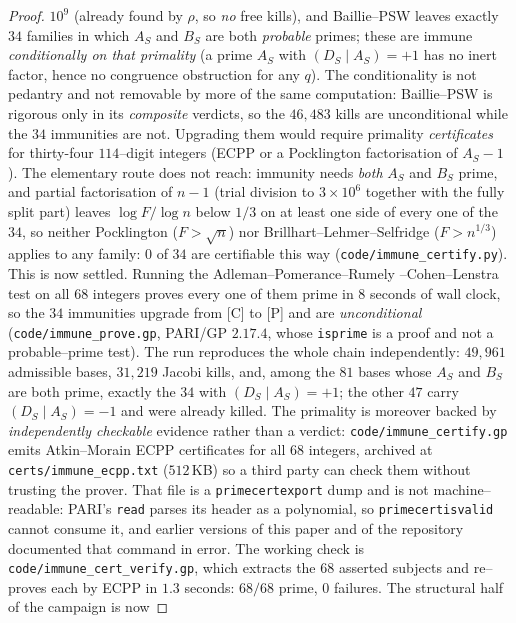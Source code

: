 \documentclass[11pt]{article}
\theoremstyle{definition}
\begin{document}
\begin{proof}
$10^9$ (already found by $\rho$, so \emph{no} free kills), and Baillie--PSW leaves exactly
$34$ families in which $A_S$ and $B_S$ are both \emph{probable} primes; these are immune
\emph{conditionally on that primality} (a prime $A_S$ with $(D_S\mid A_S)=+1$ has no inert factor,
hence no congruence obstruction for any $q$). The conditionality is not pedantry and not
removable by more of the same computation: Baillie--PSW is rigorous only in its \emph{composite}
verdicts, so the $46{,}483$ kills are unconditional while the $34$ immunities are not. Upgrading them
would require primality \emph{certificates} for thirty-four $114$--digit integers (ECPP or a
Pocklington factorisation of $A_S-1$). The elementary route does not reach: immunity needs
\emph{both} $A_S$ and $B_S$ prime, and partial factorisation of $n-1$ (trial division to
$3\times10^6$ together with the fully split part) leaves $\log F/\log n$ below $1/3$ on at least one
side of every one of the $34$, so neither Pocklington ($F>\sqrt n$) nor
Brillhart--Lehmer--Selfridge ($F>n^{1/3}$) applies to any family: $0$ of $34$ are certifiable this
way (\texttt{code/immune\_certify.py}). This is now settled. Running the Adleman--Pomerance--Rumely
--Cohen--Lenstra test on all $68$ integers proves every one of them prime in $8$ seconds of
wall clock, so the $34$ immunities upgrade from \textup{[C]} to \textup{[P]} and are
\emph{unconditional} (\texttt{code/immune\_prove.gp}, PARI/GP $2.17.4$, whose \texttt{isprime} is a
proof and not a probable--prime test). The run reproduces the whole chain independently: $49{,}961$
admissible bases, $31{,}219$ Jacobi kills, and, among the $81$ bases whose $A_S$ and $B_S$ are both
prime, exactly the $34$ with $(D_S\mid A_S)=+1$; the other $47$ carry $(D_S\mid A_S)=-1$ and were
already killed. The primality is moreover backed by
\emph{independently checkable} evidence rather than a verdict: \texttt{code/immune\_certify.gp}
emits Atkin--Morain \textup{ECPP} certificates for all $68$ integers, archived at
\texttt{certs/immune\_ecpp.txt} ($512$\,KB) so a third
party can check them without trusting the prover. That file is a \texttt{primecertexport} dump and
is not machine--readable: PARI's \texttt{read} parses its header as a polynomial, so
\texttt{primecertisvalid} cannot consume it, and earlier versions of this paper and of the
repository documented that command in error. The working check is
\texttt{code/immune\_cert\_verify.gp}, which extracts the $68$ asserted subjects and re--proves each
by \textup{ECPP} in $1.3$ seconds: $68/68$ prime, $0$ failures. The structural half of the campaign is now

\end{proof}
\end{document}
